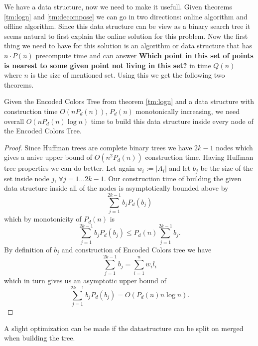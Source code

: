 \documentclass[a4paper,UKenglish,cleveref, autoref, thm-restate]{lipics-v2021}
\begin{document}
We have a data structure, now we need to make it usefull.
Given theorems \ref{tm:logn} and \ref{tm:decompose} we can go in two directions: online algorithm and offline algorithm.
Since this data structure can be view as a binary search tree it seems natural to first explain the online solution for this problem.
Now the first thing we need to have for this solution is an algorithm or data structure that has $n \cdot P\left(n\right)$ precompute time and can answer {\bf Which point in this set of points is nearest to some given point not living in this set?} in time $Q(n)$ where $n$ is the size of mentioned set.
Using this we get the following two theorems.


\begin{theorem}\label{tm:construct}
Given the Encoded Colors Tree from theorem \ref{tm:logn} and a data structure with construction time $O\left(nP_d\left(n\right)\right)$, $P_d(n)$ monotonically increasing, we need overall $O\left(nP_d(n)\log n\right)$ time to build this data structure inside every node of the Encoded Colors Tree.
\end{theorem}
\begin{proof}
Since Huffman trees are complete binary trees we have $2k - 1$ nodes which gives a naive upper bound of $O\left(n^2P_d(n)\right)$ construction time.
Having Huffman tree properties we can do better.
Let again $w_i := |A_i|$ and let $b_j$ be the size of the set inside node $j$, $\forall j = 1\dots 2k-1$.
Our construction time of building the given data structure inside all of the nodes is asymptotically bounded above by
$$ \sum\limits_{j=1}^{2k - 1} b_jP_d(b_j) $$
which by monotonicity of $P_d(n)$ is
$$ \sum\limits_{j=1}^{2k - 1} b_jP_d(b_j) \leq
P_d(n) \sum\limits_{j=1}^{2k - 1} b_j. $$
By definition of $b_j$ and construction of Encoded Colors tree we have
$$ \sum\limits_{j = 1}^{2k - 1} b_j = \sum\limits_{i = 1}^n w_il_i $$
which in turn gives us an asymptotic upper bound of
$$ \sum\limits_{j = 1}^{2k - 1} b_jP_d(b_j) = O\left( P_d(n)n \log n\right). $$
\end{proof}

\begin{remark}
A slight optimization can be made if the datastructure can be split on merged when building the tree.
\end{remark}
\end{document}
